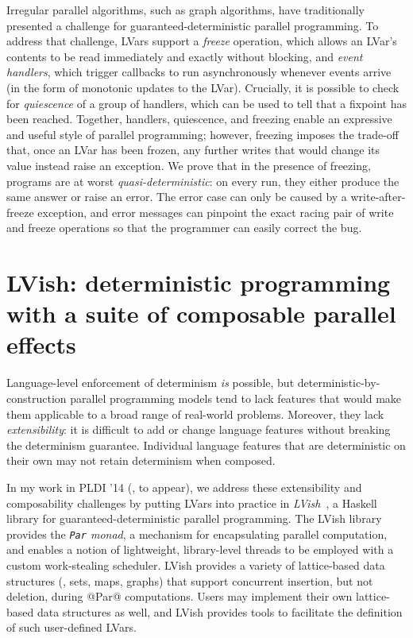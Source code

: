 \documentclass{article}
\begin{document}
Irregular parallel algorithms, such as graph algorithms, have
traditionally presented a challenge for guaranteed-deterministic
parallel programming.  To address that challenge, LVars support a
\emph{freeze} operation, which allows an LVar's contents to be read
immediately and exactly without blocking, and \emph{event handlers},
which trigger callbacks to run asynchronously whenever events arrive
(in the form of monotonic updates to the LVar).  Crucially, it is
possible to check for \emph{quiescence} of a group of handlers, which
can be used to tell that a fixpoint has been reached.  Together,
handlers, quiescence, and freezing enable an expressive and useful
style of parallel programming; however, freezing imposes the trade-off
that, once an LVar has been frozen, any further writes that would
change its value instead raise an exception.  We prove that in the
presence of freezing, programs are at worst
\emph{quasi-deterministic}: on every run, they either produce the same
answer or raise an error.  The error case can only be caused by a
write-after-freeze exception, and error messages can pinpoint the
exact racing pair of write and freeze operations so that the
programmer can easily correct the bug.

\section{LVish: deterministic programming with a suite of composable parallel effects}\label{effectzoo}

Language-level enforcement of determinism \emph{is} possible, but
deterministic-by-construction parallel programming models tend to lack
features that would make them applicable to a broad range of
real-world problems. Moreover, they lack \emph{extensibility}: it is
difficult to add or change language features without breaking the
determinism guarantee.  Individual language features that are
deterministic on their own may not retain determinism when composed.

In my work in PLDI '14 (\cite{effectzoo}, to appear), we address these
extensibility and composability challenges by putting LVars into
practice in \emph{LVish}~\cite{LVish}, a Haskell library for
guaranteed-deterministic parallel programming.  The LVish library
provides the \emph{\lstinline|Par| monad}, a mechanism for
encapsulating parallel computation, and enables a notion of
lightweight, library-level threads to be employed with a custom
work-stealing scheduler.  LVish provides a variety of lattice-based
data structures (\eg, sets, maps, graphs) that support concurrent
insertion, but not deletion, during @Par@ computations.  Users may
implement their own lattice-based data structures as well, and LVish
provides tools to facilitate the definition of such user-defined
LVars.
\end{document}
